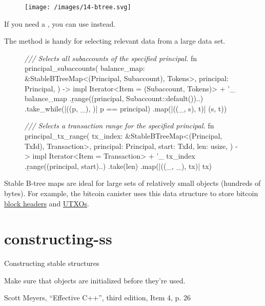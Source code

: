 \documentclass{article}
\begin{document}
\begin{figure}[grayscale-diagram]
  \texttt{[image: /images/14-btree.svg]}
\end{figure}

If you need a , you can use  instead.

The  method is handy for selecting relevant data from a large data set.

\begin{figure}
\label{range-scan-example}
\begin{code}[rust]
\emph{/// Selects all subaccounts of the specified principal.}
fn \b{principal_subaccounts}(
  balance_map: &StableBTreeMap<(Principal, Subaccount), Tokens>,
  principal: Principal,
) -> impl Iterator<Item = (Subaccount, Tokens)> + '_ {
  balance_map
    .\b{range}((principal, Subaccount::default())..)
    .take_while(|((p, _), )| p == principal)
    .map(|((_, s), t)| (s, t))
}

\emph{/// Selects a transaction range for the specified principal.}
fn \b{principal_tx_range}(
  tx_index: &StableBTreeMap<(Principal, TxId), Transaction>,
  principal: Principal,
  start: TxId,
  len: usize,
) -> impl Iterator<Item = Transaction> + '_ {
  tx_index
    .\b{range}((principal, start)..)
    .take(len)
    .map(|((_, _), tx)| tx)
}
\end{code}
\end{figure}

Stable B-tree maps are ideal for large sets of relatively small objects (hundreds of bytes).
For example, the bitcoin canister uses this data structure to store bitcoin \href{https://github.com/dfinity/bitcoin-canister/blob/9242d5f9a784ac115c2042fd09705dd9321ff7b7/canister/src/block_header_store.rs#L13}{block headers} and \href{https://github.com/dfinity/bitcoin-canister/blob/9242d5f9a784ac115c2042fd09705dd9321ff7b7/canister/src/utxo_set/utxos.rs}{UTXOs}.

\section{constructing-ss}{Constructing stable structures}
\epigraph{
  Make sure that objects are initialized before they're used.
}{Scott Meyers, ``Effective C++'', third edition, Item 4, p. 26}
\end{document}
